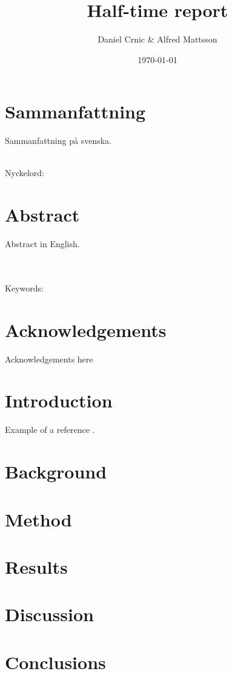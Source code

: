 \documentclass[12pt,a4paper]{book}
\title{Half-time report}
\author{Daniel Crnic \& Alfred Mattsson}
\date{\today}
\begin{document}


\chapter*{Sammanfattning}
Sammanfattning på svenska.

\\ 
Nyckelord:

\chapter*{Abstract}
Abstract in English.

\\ \\
Keywords: 

\chapter*{Acknowledgements}
Acknowledgements here


\tableofcontents

\chapter{Introduction}
\setcounter{page}{1}
Example of a reference \cite{example}.

\chapter{Background}

\chapter{Method}

\chapter{Results}

\chapter{Discussion}

\chapter{Conclusions}
\end{document}
